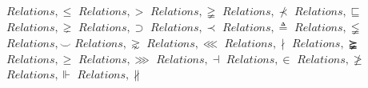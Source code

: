 \documentclass{article}
\begin{document}
$Relations,\leqslant$
\linebreak
\linebreak
$Relations,>$
\linebreak
\linebreak
$Relations,\gneqq$
\linebreak
\linebreak
$Relations,\nprec$
\linebreak
\linebreak
$Relations,\sqsubseteq$
\linebreak
\linebreak
$Relations,\gneq$
\linebreak
\linebreak
$Relations,\supset$
\linebreak
\linebreak
$Relations,\prec$
\linebreak
\linebreak
$Relations,\triangleq$
\linebreak
\linebreak
$Relations,\lneqq$
\linebreak
\linebreak
$Relations,\smile$
\linebreak
\linebreak
$Relations,\gnsim$
\linebreak
\linebreak
$Relations,\lll$
\linebreak
\linebreak
$Relations,\nmid$
\linebreak
\linebreak
$Relations,\succneqq$
\linebreak
\linebreak
$Relations,\ge$
\linebreak
\linebreak
$Relations,\ggg$
\linebreak
\linebreak
$Relations,\dashv$
\linebreak
\linebreak
$Relations,\in$
\linebreak
\linebreak
$Relations,\ngeqslant$
\linebreak
\linebreak
$Relations,\Vdash$
\linebreak
\linebreak
$Relations,\nparallel$
\linebreak
\end{document}
